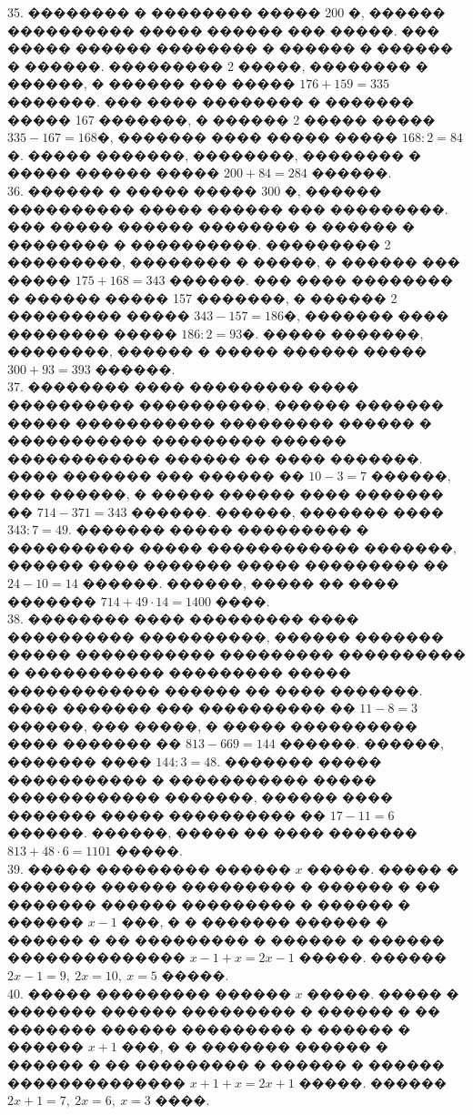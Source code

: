\documentclass[12pt]{article}
\begin{document}
35. �������� � �������� ����� 200 �, ������ ���������� ����� ������ ��� �����. ��� ����� ������ �������� � ������ � ������ � ������. ��������� 2 �����, �������� � ������, � ������ ��� ����� $176+159=335$ �������. ��� ���� �������� � ������� ����� 167 �������, � ������ 2 ����� ����� $335-167=168$�, ������� ���� ����� ����� $168:2=84$�. ����� �������, ��������, �������� � ����� ������ ����� $200+84=284$ ������.\\
36. ������ � ����� ����� 300 �, ������ ���������� ����� ������ ��� ���������. ��� ����� ������ �������� � ������ � �������� � ����������. ��������� 2 ���������, �������� � �����, � ������ ��� ����� $175+168=343$ ������. ��� ���� �������� � ������ ����� 157 �������, � ������ 2 ��������� ����� $343-157=186$�, ������� ���� �������� ����� $186:2=93$�. ����� �������, ��������, ������ � ����� ������ ����� $300+93=393$ ������.\\
37. �������� ���� ��������� ���� ���������� ����������, ������ ������� ����� ����������� ��������� ������ � ����������� ��������� ������ ������������ ������ �� ���� �������. ���� ������� ��� ������ �� $10-3=7$ ������, ��� ������, � ����� ������ ���� ������� �� $714-371=343$ ������. ������, ������� ���� $343:7=49.$ ������� ����� ��������� � ���������� ����� ������������ �������, ������ ���� ������� ����� ��������� �� $24-10=14$ ������. ������, ����� �� ���� ������� $714+49\cdot14=1400$ ����.\\
38. �������� ���� ��������� ���� ���������� ����������, ������ ������� ����� ����������� ��������� ���������� � ����������� ��������� ����� ������������ ������ �� ���� �������. ���� ������� ��� ���������� �� $11-8=3$ ������, ��� �����, � ����� ���������� ���� ������� �� $813-669=144$ ������. ������, ������� ���� $144:3=48.$ ������� ����� ����������� � ����������� ����� ������������ �������, ������ ���� ������� ����� ���������� �� $17-11=6$ ������. ������, ����� �� ���� ������� $813+48\cdot6=1101$ �����.\\
39. ����� ��������� ������ $x$ �����. ����� � ������� ������ ��������� � ������ � �� ������� ������ ��������� � ������ � ������ $x-1$ ���, � � ������� ������ � ������ � �� ��������� � ������ � ������ �������������� $x-1+x=2x-1$ �����. ������ $2x-1=9,\ 2x=10,\ x=5$ �����.\\
40. ����� ��������� ������ $x$ �����. ����� � ������� ������ ��������� � ������ � �� ������� ������ ��������� � ������ � ������ $x+1$ ���, � � ������� ������ � ������ � �� ��������� � ������ � ������ �������������� $x+1+x=2x+1$ �����. ������ $2x+1=7,\ 2x=6,\ x=3$ ����.\\
\end{document}
